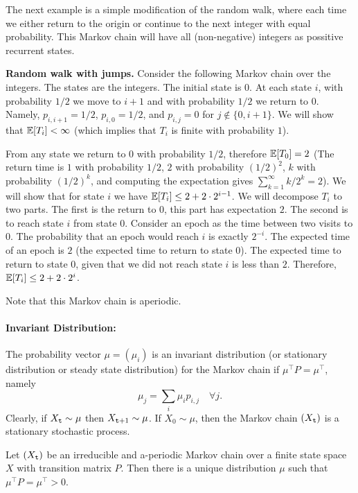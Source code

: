 The next example is a simple modification of the random walk, where each time we either return to the origin or continue to the next integer with equal probability. 
This Markov chain will have all (non-negative) integers as possitive recurrent states.

\begin{example}
{\bf Random walk with jumps.}
%
Consider the following Markov chain over the integers. The states
are the integers. The initial state is $0$. At each state $i$, with
probability $1/2$ we move to $i+1$ and with probability $1/2$ we
return to $0$. Namely, $p_{i,i+1}=1/2$, $p_{i,0}=1/2$, and $p_{i,j}
=0$ for $j \not\in \{0,i+ 1\}$. We will show that $\mathbb{E}[T_i]<\infty$
(which implies that $T_i$ is finite with probability $1$).

From any state we return to $0$ with probability $1/2$, therefore
$\mathbb{E}[T_0]=2$ (The return time is $1$ with probability $1/2$, $2$ with probability $(1/2)^2$, $k$ with probability $(1/2)^k$, and computing the expectation gives $\sum_{k=1}^\infty k/2^k = 2$). We will show that for state $i$ we have
$\mathbb{E}[T_i]\leq2+2\cdot 2^{i-1}$. We will decompose $T_i$ to two parts. The
first is the return to $0$, this part has expectation $2$. The
second is to reach state $i$ from state $0$. Consider an epoch as
the time between two visits to $0$. The probability that an epoch
would reach $i$ is exactly $2^{-i}$. The expected time of an epoch
is $2$ (the expected time to return to state $0$). The expected time
to return to state $0$, given that we did not reach state $i$ is
less than $2$. Therefore, $\mathbb{E}[T_i]\leq 2+2\cdot 2^{i}$.

Note that this Markov chain is aperiodic.
\end{example}



\paragraph{Invariant Distribution:} %
The probability vector $\mu  = ({\mu_i})$ is an invariant
distribution (or stationary distribution or steady state
distribution) for the Markov chain if $\mu^\top P = \mu^\top$,
namely
\[{\mu_j} = \sum_i {{\mu_i}} {p_{i,j}}\quad \forall j.\]
Clearly, if ${X_{\tt t}} \sim \mu $ then ${X_{{\tt t} + 1}} \sim \mu
$. If ${X_0} \sim \mu $, then the Markov chain $({X_{\tt t}})$ is a
stationary stochastic process.


\begin{theorem}
\label{Thm:MC-stationary}
 Let $({X_{\tt t}})$ be an irreducible and
a-periodic Markov chain over a finite state space $X$ with
transition matrix $P$. Then there is a unique distribution $\mu$
such that $\mu^\top P = \mu^\top >0$.
\end{theorem}

